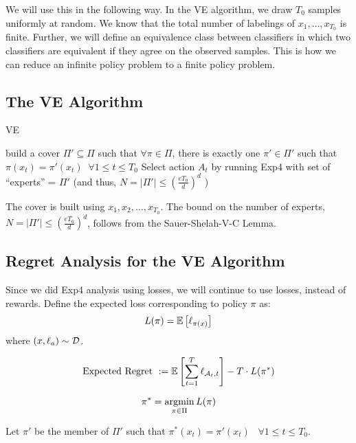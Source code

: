 \documentclass[11pt]{article}
\begin{document}
We will use this in the following way. In the VE algorithm, we draw $T_0$ samples uniformly at random. We know that the total number of labelings of $x_1,\ldots,x_{T_0}$ is finite. Further, we will define an equivalence class between classifiers in which two classifiers are equivalent if they agree on the observed samples. This is how we can reduce an infinite policy problem to a finite policy problem. 

\newpage
\subsection{The VE Algorithm}

\begin{algorithm}
\caption{VE}
\label{alg: VE}
\begin{algorithmic}
\ENDFOR
\STATE build a cover  $\Pi' \subseteq \Pi$ such that $\forall \pi \in \Pi$, there is exactly one $\pi' \in \Pi'$ such that $\pi(x_t) = \pi'(x_t)\;\;\forall 1 \le t \le T_0$
\STATE Select action $A_t$ by running Exp4 with set of ``experts'' = $\Pi'$ (and thus,  $N = |\Pi'| \le (\frac{eT_0}{d})^d$ )
\ENDFOR
\end{algorithmic}
\end{algorithm}
The cover is built using $x_1,x_2,\ldots,x_{T_0}$. The bound on the number of experts, $N= |\Pi'| \le (\frac{eT_0}{d})^d$, follows from the Sauer-Shelah-V-C Lemma. 

%
%
\subsection{Regret Analysis for the VE Algorithm}

Since we did Exp4 analysis using losses, we will continue to use losses, instead of rewards.
Define the expected loss corresponding to policy $\pi$ as:
\begin{equation}
L(\pi) = \mathbb{E}\left[ \ell_{\pi(x)} \right]
\end{equation}
where ${(x,\ell_a)\sim \mathcal{D}}$.

\begin{equation}
\text{Expected Regret }:= \mathbb{E}\left[ \sum_{t=1}^T\ell_{\mathcal{A}_t,t} \right] - T\cdot L(\pi^*)
\end{equation}

$$\pi^*=\operatorname*{argmin}_{\pi\in\Pi} L(\pi)$$

Let $\pi'$ be the member of $\Pi'$ such that $\pi^*(x_t) = \pi'(x_t)\;\;\;\forall 1\le t \le T_0$.
\end{document}
